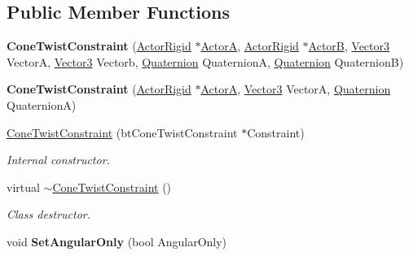 \subsection*{Public Member Functions}
\begin{DoxyCompactItemize}
\item 
\hypertarget{classphys_1_1ConeTwistConstraint_ab72e1489ea91e47ebbeee41dee116040}{
{\bfseries ConeTwistConstraint} (\hyperlink{classphys_1_1ActorRigid}{ActorRigid} $\ast$\hyperlink{classphys_1_1TypedConstraint_a0fefb80c80d433bec9942b851b2f5a8a}{ActorA}, \hyperlink{classphys_1_1ActorRigid}{ActorRigid} $\ast$\hyperlink{classphys_1_1TypedConstraint_a04d2c49698d9a161e92112dd1efc1dcd}{ActorB}, \hyperlink{classphys_1_1Vector3}{Vector3} VectorA, \hyperlink{classphys_1_1Vector3}{Vector3} Vectorb, \hyperlink{classphys_1_1Quaternion}{Quaternion} QuaternionA, \hyperlink{classphys_1_1Quaternion}{Quaternion} QuaternionB)}
\label{da/dbc/classphys_1_1ConeTwistConstraint_ab72e1489ea91e47ebbeee41dee116040}

\item 
\hypertarget{classphys_1_1ConeTwistConstraint_ab9c2ee7346f1b862d508cbefe22e54e0}{
{\bfseries ConeTwistConstraint} (\hyperlink{classphys_1_1ActorRigid}{ActorRigid} $\ast$\hyperlink{classphys_1_1TypedConstraint_a0fefb80c80d433bec9942b851b2f5a8a}{ActorA}, \hyperlink{classphys_1_1Vector3}{Vector3} VectorA, \hyperlink{classphys_1_1Quaternion}{Quaternion} QuaternionA)}
\label{da/dbc/classphys_1_1ConeTwistConstraint_ab9c2ee7346f1b862d508cbefe22e54e0}

\item 
\hyperlink{classphys_1_1ConeTwistConstraint_a38a9a0e7676d8ad8f77831a319bc007b}{ConeTwistConstraint} (btConeTwistConstraint $\ast$Constraint)
\begin{DoxyCompactList}\small\item\em Internal constructor. \item\end{DoxyCompactList}\item 
virtual \hyperlink{classphys_1_1ConeTwistConstraint_aae5d4aeeff871a2ec79bdb7d493588df}{$\sim$ConeTwistConstraint} ()
\begin{DoxyCompactList}\small\item\em Class destructor. \item\end{DoxyCompactList}\item 
\hypertarget{classphys_1_1ConeTwistConstraint_a1e2ffb465a8ceab4b77663b9e446a3ae}{
void {\bfseries SetAngularOnly} (bool AngularOnly)}
\label{da/dbc/classphys_1_1ConeTwistConstraint_a1e2ffb465a8ceab4b77663b9e446a3ae}


\end{DoxyCompactItemize}
